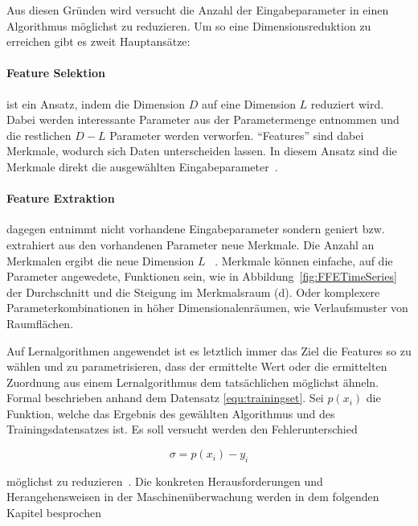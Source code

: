 Aus diesen Gründen wird versucht die Anzahl der Eingabeparameter in einen Algorithmus möglichst zu reduzieren. Um so eine Dimensionsreduktion zu erreichen gibt es zweit Hauptansätze:
\paragraph{Feature Selektion} ist ein Ansatz, indem die Dimension $D$ auf eine Dimension $L$ reduziert wird. Dabei werden interessante Parameter aus der Parametermenge entnommen und die restlichen $D-L$ Parameter werden verworfen. \enquote{Features} sind dabei Merkmale, wodurch sich Daten unterscheiden lassen. In diesem Ansatz sind die Merkmale direkt die ausgewählten Eingabeparameter~\cite{alpaydin2014introduction}.

\paragraph{Feature Extraktion} dagegen entnimmt nicht vorhandene Eingabeparameter sondern geniert bzw. extrahiert aus den vorhandenen Parameter neue Merkmale. Die Anzahl an Merkmalen ergibt die neue Dimension $L$ ~\cite{alpaydin2014introduction}.
Merkmale können einfache, auf die Parameter angewedete, Funktionen sein, wie in Abbildung\ \ref{fig:FFETimeSeries} der Durchschnitt und die Steigung im Merkmalsraum (d). Oder komplexere Parameterkombinationen in höher Dimensionalenräumen, wie Verlaufsmuster von Raumflächen.

Auf Lernalgorithmen angewendet ist es letztlich immer das Ziel die Features so zu wählen und zu parametrisieren, dass der ermittelte Wert oder die ermittelten Zuordnung aus einem Lernalgorithmus dem tatsächlichen möglichst ähneln. Formal beschrieben anhand dem Datensatz \ref{equ:trainingset}. Sei $p(x_i)$ die Funktion, welche das Ergebnis des gewählten Algorithmus und des Trainingsdatensatzes ist. Es soll versucht werden den Fehlerunterschied

\begin{equation}
  \sigma = p(x_i)-y_i
\end{equation}

möglichst zu reduzieren~\cite{gensler2015fast}. Die konkreten Herausforderungen und Herangehensweisen in der Maschinenüberwachung werden in dem folgenden Kapitel besprochen

